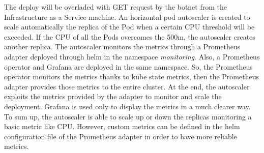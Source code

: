 \documentclass[a4paper]{article}
\begin{document}
The deploy will be overladed with GET request by the botnet from the Infrastructure as a Service machine. An horizontal pod autoscaler is created to scale automatically the replica of the Pod when a certain CPU threshold will be exceeded. If the CPU of all the Pods overcomes the 500m, the autoscaler creates another replica. The autoscaler monitors the metrics through a Prometheus adapter deployed through helm in the namespace \textit{monitoring}. Also, a Prometheus operator and Grafana are deployed in the same namespace. So, the Prometheus operator monitors the metrics thanks to kube state metrics, then the Prometheus adapter provides those metrics to the entire cluster. At the end, the autoscaler exploits the metrics provided by the adapter to monitor and scale the deployment. Grafana is used only to display the metrics in a much clearer way.\\
To sum up, the autoscaler is able to scale up or down the replicas monitoring a basic metric like CPU. However, custom metrics can be defined in the helm configuration file of the Prometheus adapter in order to have more reliable metrics.
\end{document}
